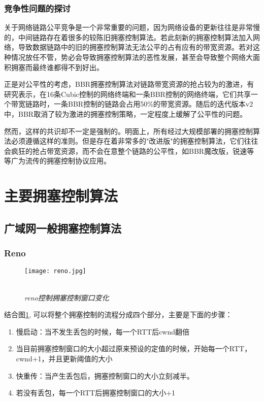 \documentclass[a4paper, 12pt, UTF8]{ctexart}
\begin{document}
\subsubsection{竞争性问题的探讨}
\par 关于网络链路公平竞争是一个非常重要的问题，因为网络设备的更新往往是非常慢的，中间链路存在着很多的较陈旧拥塞控制算法。若此刻新的拥塞控制算法加入网络，导致数据链路中的旧的拥塞控制算法无法公平的占有应有的带宽资源。若对这种情况放任不管，势必会导致拥塞控制算法的恶性发展，甚至会导致整个网络大面积拥塞而最终谁都得不到好出。

\par 正是对公平性的考虑，BBR拥塞控制算法对链路带宽资源的抢占较为的激进，有研究表示\cite{DBLP:conf/sigcomm/SivaramanWTB14}，在16条Cubic控制的网络终端和一条BBR控制的网络终端，它们共享一个带宽链路时，一条BBR控制的链路会占用50\%的带宽资源。随后的迭代版本v2\cite{bbrv2}中，BBR取消了较为激进的拥塞控制策略，一定程度上缓解了公平性的问题。

\par 然而，这样的共识却不一定是强制的。明面上，所有经过大规模部署的拥塞控制算法必须遵循这样的准则。但是存在着非常多的"改进版"的拥塞控制算法，它们往往会疯狂的抢占带宽资源，而不会在意整个链路的公平性，如BBR魔改版，锐速等等\cite{linux-netspeed}广为流传的拥塞控制协议应用。

\clearpage

\section{主要拥塞控制算法}

\subsection{广域网一般拥塞控制算法}

\subsubsection{Reno}
\begin{figure}[H]
	\centering \texttt{[image: reno.jpg]}
	\\ \hspace*{\fill} \\
	\caption{\em reno控制拥塞控制窗口变化}
	\label{fig:reno algorithm}
\end{figure}
\par 结合图\ref{fig:reno algorithm}, 可以将整个拥塞控制的流程分成四个部分，主要是下面的步骤：
\begin{enumerate}
	\item 慢启动：当不发生丢包的时候，每一个RTT后cwnd翻倍
	\item 当目前拥塞控制窗口的大小超过原来预设的定值的时候，开始每一个RTT，cwnd+1，并且更新阈值的大小
	\item 快重传：当产生丢包后，拥塞控制窗口的大小立刻减半。
	\item 若没有丢包，每一个RTT后拥塞控制窗口的大小+1
\end{enumerate}
\end{document}
